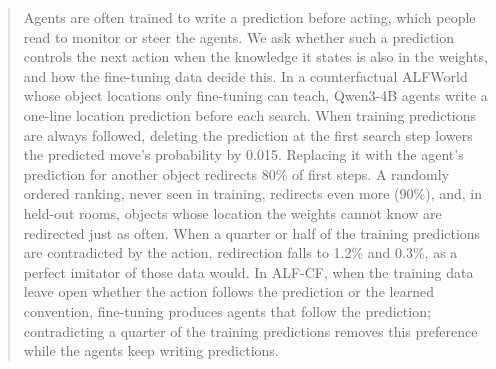 \begin{abstract}
Agents are often trained to write a prediction before acting, which people read to monitor or steer the agents. We ask whether such a prediction controls the next action when the knowledge it states is also in the weights, and how the fine-tuning data decide this. In a counterfactual ALFWorld whose object locations only fine-tuning can teach, Qwen3-4B agents write a one-line location prediction before each search. When training predictions are always followed, deleting the prediction at the first search step lowers the predicted move's probability by 0.015. Replacing it with the agent's prediction for another object redirects 80\% of first steps. A randomly ordered ranking, never seen in training, redirects even more (90\%), and, in held-out rooms, objects whose location the weights cannot know are redirected just as often. When a quarter or half of the training predictions are contradicted by the action, redirection falls to 1.2\% and 0.3\%, as a perfect imitator of those data would. In ALF-CF, when the training data leave open whether the action follows the prediction or the learned convention, fine-tuning produces agents that follow the prediction; contradicting a quarter of the training predictions removes this preference while the agents keep writing predictions.
\end{abstract}
